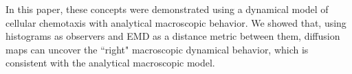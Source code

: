 \documentclass[prl, reprint, final, showkeys]{revtex4-1}
\begin{document}
In this paper, these concepts were demonstrated using a dynamical model of cellular chemotaxis with analytical macroscopic behavior.
%
We showed that, using histograms as observers and EMD as a distance metric between them, diffusion maps can uncover the ``right" macroscopic dynamical behavior, which is consistent with the analytical macroscopic model.







\end{document}
